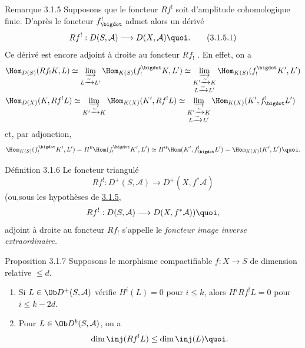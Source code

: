 \begin{enonce*}[remark]{Remarque 3.1.5}
Supposons que le foncteur $Rf^{!}$ soit d'amplitude cohomologique
finie. D'après  le foncteur $f^{!}_{\bigdot}$ admet alors
un dérivé
\begin{equation*}
Rf^{!}:D(S,\mathcal{A})\longrightarrow D(X,\mathcal{A}){\quoi}.\tag{3.1.5.1}
\end{equation*}%
Ce dérivé est encore adjoint à droite au foncteur $Rf_{!}$
. En effet, on a
\begin{align*}
& \Hom_{D(S)}(Rf_{!}K,L)\simeq
\varinjlim_{L\xrightarrow{\sim}L'}\Hom_{K(S)}(f^{\bigdot}_{!}K,L')\simeq
\varinjlim_{\substack{K'\xrightarrow{\sim}K\\ L\xrightarrow{\sim}
L'}}\Hom_{K(S)} (f^{\bigdot}_{!}K', L')\\
& \Hom_{D(X)}(K,Rf^{!}L)\simeq
\varinjlim_{K'\xrightarrow{\sim}K}\Hom_{K(X)}(K',Rf^{!}L)\simeq
\varinjlim_{\substack{K'\xrightarrow{\sim}K\\
L\xrightarrow{\sim}L'}}\Hom_{K(X)}(K', f^{!}_{\bigdot}L')
\end{align*}
et, par adjonction,
$$
\Hom_{K(S)}(f^{\bigdot}_{!}K',L')=H^{0}\Hom(f^{\bigdot}_{!}K',L')\simeq
H^{0}\Hom(K',f^{!}_{\bigdot}L')=\Hom_{K(X)}(K',L'){\quoi}.
$$
\end{enonce*}

\begin{enonce*}{Définition 3.1.6}
Le foncteur triangulé
$$
Rf^{!}:D^{+}(S,\mathcal{A})\longrightarrow
D^{+}(X,f^{\ast}\mathcal{A})
$$
(ou,\pageoriginale sous les hypothèses de \hyperref[XVIII.rem3.1.5]{3.1.5},
$$
Rf^{!}:D(S,\mathcal{A})\longrightarrow
D(X,f^{\ast}\mathcal{A})){\quoi},
$$
adjoint à droite au foncteur $Rf_{!}$  s'appelle le
\emph{foncteur image inverse extraordinaire.}
\end{enonce*}

\begin{enonce*}{Proposition 3.1.7}
Supposons le morphisme compactifiable $f:X\rightarrow S$ de dimension
relative $\leq d$.
\begin{enumerate}
\renewcommand{\theenumi}{\roman{enumi}}
\renewcommand{\labelenumi}{(\theenumi)}
\item Si $L\in \Ob D^{+}(S,\mathcal{A})$ vérifie $H^{i}(L)=0$ pour
$i\leq k$, alors $H^{i}Rf^{!}L=0$ pour $i\leq k-2d$.

\item Pour $L\in \Ob D^{b}(S,\mathcal{A})$, on a
$$
\dim \inj (Rf^{!}L)\leq \dim \inj (L){\quoi}.
$$
\end{enumerate}
\end{enonce*}

